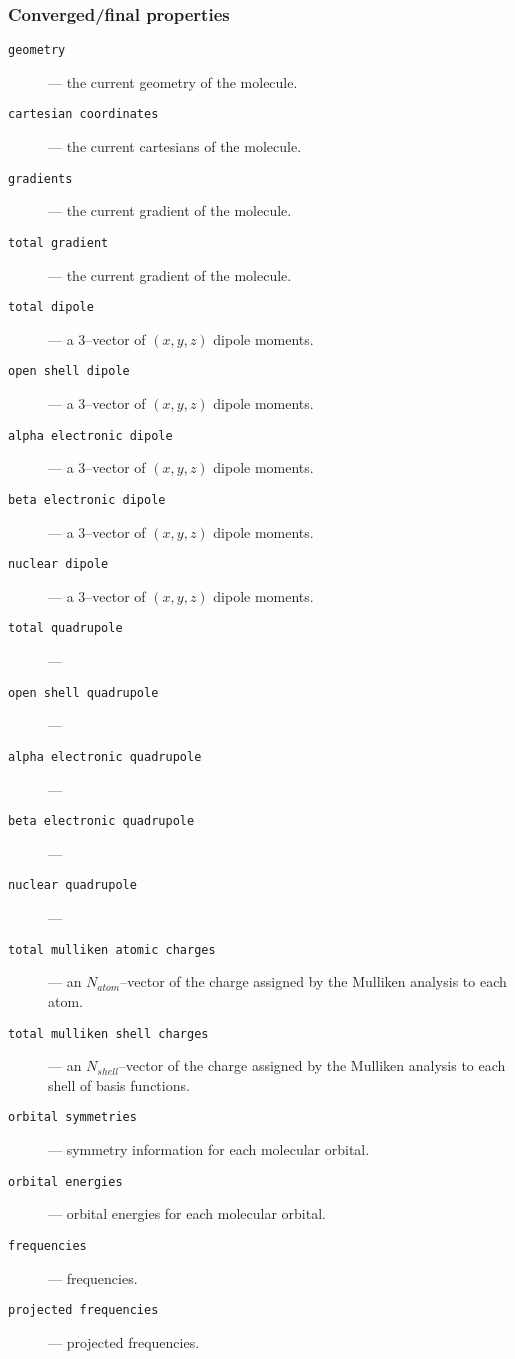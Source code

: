 \subsubsection{Converged/final properties}

\begin{description}
\item [\texttt{geometry}] --- the current geometry of the molecule.
\item [\texttt{cartesian coordinates}] --- the current cartesians of the molecule.
\item [\texttt{gradients}] --- the current gradient of the molecule.
\item [\texttt{total gradient}] --- the current gradient of the molecule.
\item [\texttt{total dipole}] --- a 3--vector of $(x,y,z)$ dipole
  moments.
\item [\texttt{open shell dipole}] --- a 3--vector of $(x,y,z)$ dipole
  moments.
\item [\texttt{alpha electronic dipole}] --- a 3--vector of $(x,y,z)$ dipole
  moments.
\item [\texttt{beta electronic dipole}] --- a 3--vector of $(x,y,z)$ dipole
  moments.
\item [\texttt{nuclear dipole}] --- a 3--vector of $(x,y,z)$ dipole
  moments.
\item [\texttt{total quadrupole}] ---
\item [\texttt{open shell quadrupole}] ---
\item [\texttt{alpha electronic quadrupole}] ---
\item [\texttt{beta electronic quadrupole}] ---
\item [\texttt{nuclear quadrupole}] ---
\item [\texttt{total mulliken atomic charges}] --- an $N_{atom}$--vector of the charge
  assigned by the Mulliken analysis to each atom.
\item [\texttt{total mulliken shell charges}] --- an $N_{shell}$--vector of
  the charge assigned by the Mulliken analysis to each shell of basis
  functions. 
\item [\texttt{orbital symmetries}] --- symmetry information for each molecular 
  orbital.
\item [\texttt{orbital energies}] --- orbital energies for each molecular orbital.
\item [\texttt{frequencies}] --- frequencies.
\item [\texttt{projected frequencies}] --- projected frequencies.

\end{description}
